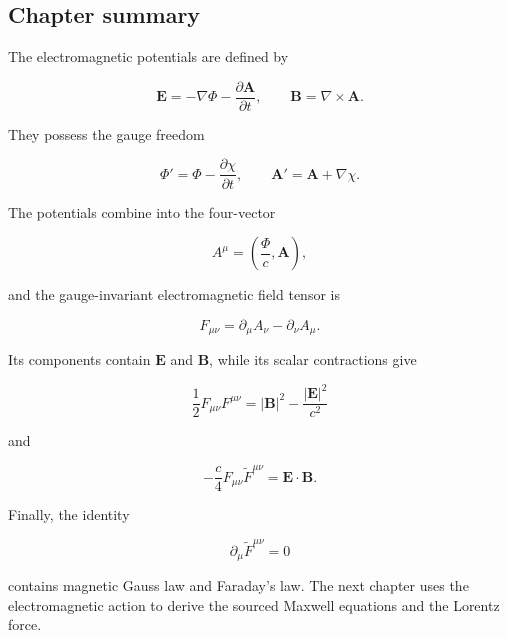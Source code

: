 \subsection{Chapter summary}

The electromagnetic potentials are defined by

\[
\mathbf{E}
=
-\nabla\Phi
-
\frac{\partial\mathbf{A}}{\partial t},
\qquad
\mathbf{B}
=
\nabla\times\mathbf{A}.
\]

They possess the gauge freedom

\[
\Phi'
=
\Phi-
\frac{\partial\chi}{\partial t},
\qquad
\mathbf{A}'
=
\mathbf{A}+
\nabla\chi.
\]

The potentials combine into the four-vector

\[
A^{\mu}
=
\left(
\frac{\Phi}{c},
\mathbf{A}
\right),
\]

and the gauge-invariant electromagnetic field tensor is

\[
F_{\mu\nu}
=
\partial_{\mu}A_{\nu}
-
\partial_{\nu}A_{\mu}.
\]

Its components contain \(\mathbf{E}\) and \(\mathbf{B}\), while its scalar contractions give

\[
\frac{1}{2}
F_{\mu\nu}F^{\mu\nu}
=
|\mathbf{B}|^2
-
\frac{|\mathbf{E}|^2}{c^2}
\]

and

\[
-
\frac{c}{4}
F_{\mu\nu}
\widetilde{F}^{\mu\nu}
=
\mathbf{E}\cdot\mathbf{B}.
\]

Finally, the identity

\[
\partial_{\mu}
\widetilde{F}^{\mu\nu}=0
\]

contains magnetic Gauss law and Faraday's law. The next chapter uses the electromagnetic action to derive the sourced Maxwell equations and the Lorentz force.
